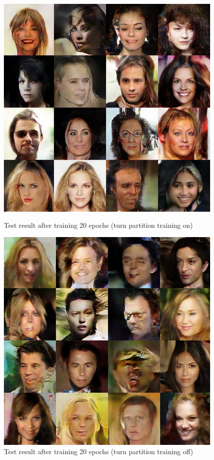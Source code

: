 \begin{figure}
    \begin{minipage}[t]{0.48\linewidth}
        \centering
        \includegraphics[width=\textwidth]{figures/result_part_on.png}
        \caption{Test result after training 20 epochs (turn partition training on)}
        \label{part_on}
    \end{minipage}
        \hfill
    \begin{minipage}[t]{0.48\linewidth}
        \centering
        \includegraphics[width=\textwidth]{figures/result_part_off.png}
        \caption{Test result after training 20 epochs (turn partition training off)}
        \label{part_off}
    \end{minipage}
\end{figure}

